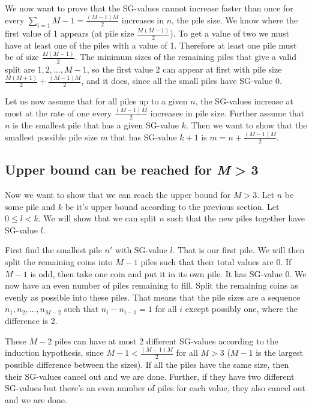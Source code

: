 \documentclass[english,a4paper,twoside]{amsart}
\theoremstyle{definition}
\begin{document}
We now want to prove that the SG-values cannot increase faster than once for every
$\sum_{i=1}{M-1} = \frac{(M-1)M}{2}$ increases in $n$, the pile size. We know where the first value
of 1 appears (at pile size $\frac{M(M-1)}{2}$). To get a value of two we must have at least one of the piles
with a value of 1. Therefore at least one pile must be of size $\frac{M(M-1)}{2}$. The minimum sizes of
the remaining piles that give a valid split are $1, 2, ..., M-1$, so the first value 2 can appear at
first with pile size $\frac{M(M+1)}{2} + \frac{(M-1)M}{2}$, and it does, since all the small piles
have SG-value 0.

Let us now assume that for all piles up to a given $n$, the SG-values increase at most at the rate
of one every $\frac{(M-1)M}{2}$ increases in pile size. Further assume that $n$ is the smallest pile
that has a given SG-value $k$. Then we want to show that the smallest possible pile size $m$ that has
SG-value $k+1$ is $m = n+\frac{(M-1)M}{2}$.

\subsection{Upper bound can be reached for \emph{M} > 3}
Now we want to show that we can reach the upper bound for $M > 3$. Let $n$ be some pile and $k$ be
it's upper bound according to the previous section. Let $0 \leq l < k$. We will show that we can
split $n$ such that the new piles together have SG-value $l$.

First find the smallest pile $n'$ with SG-value $l$. That is our first pile. We will then split the
remaining coins into $M-1$ piles such that their total values are 0. If $M-1$ is odd, then take
one coin and put it in its own pile. It has SG-value 0. We now have an even number of piles remaining
to fill. Split the remaining coins as evenly as possible into these piles. That means that the
pile sizes are a sequence $n_1, n_2, ..., n_{M-2}$ such that $n_i - n_{i-1} = 1$ for all $i$ except
possibly one, where the difference is 2.

These $M-2$ piles can have at most 2 different SG-values according to the induction hypothesis,
since $M-1 < \frac{(M-1)M}{2}$ for all $M > 3$ ($M-1$ is the largest possible difference between the sizes).
If all the piles have the same size, then their SG-values cancel out and we are done.
Further, if they have two different SG-values but there's an even number of piles for each value, they
also cancel out and we are done.
\end{document}
